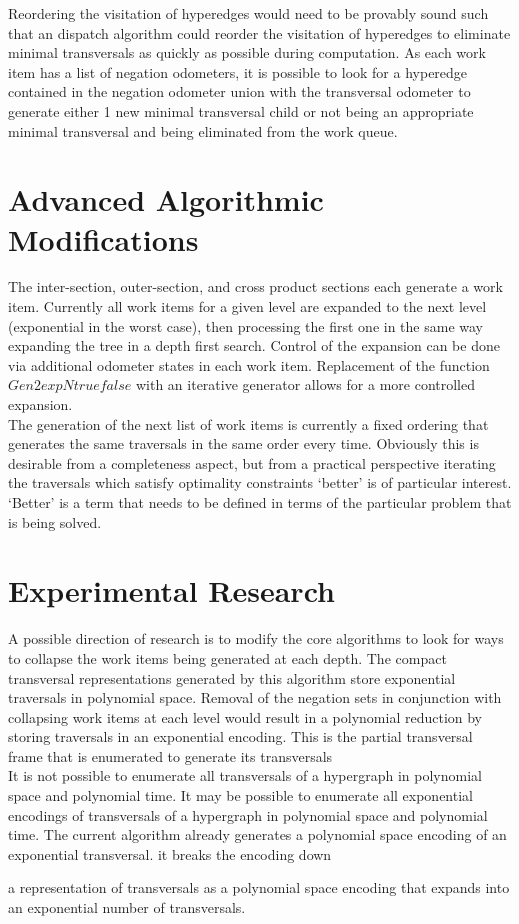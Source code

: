 Reordering the visitation of hyperedges would need to be provably sound such that an dispatch algorithm could reorder the visitation of hyperedges to eliminate minimal transversals as quickly as possible during computation. As each work item has a list of negation odometers, it is possible to look for a hyperedge contained in the negation odometer union with the transversal odometer to generate either 1 new minimal transversal child or not being an appropriate minimal transversal and being eliminated from the work queue. \\




\section{Advanced Algorithmic Modifications}
The inter-section, outer-section, and cross product sections each generate a work item. Currently all work items for a given level are expanded to the next level (exponential in the worst case), then processing the first one in the same way expanding the tree in a depth first search. Control of the expansion can be done via additional odometer states in each work item. Replacement of the function $Gen2expNtruefalse$ with an iterative generator allows for a more controlled expansion. \\

The generation of the next list of work items is currently a fixed ordering that generates the same traversals in the same order every time. Obviously this is desirable from a completeness aspect, but from a practical perspective iterating the traversals which satisfy optimality constraints `better' is of particular interest. `Better' is a term that needs to be defined in terms of the particular problem that is being solved. \cite{khachiyan2006efficient}\\




\section{Experimental Research}
A possible direction of research is to modify the core algorithms to look for ways to collapse the work items being generated at each depth. The compact transversal representations generated by this algorithm store exponential traversals in polynomial space. Removal of the negation sets in conjunction with collapsing work items at each level would result in a polynomial reduction by storing traversals in an exponential encoding. This is the partial transversal frame that is enumerated to generate its transversals \\

It is not possible to enumerate all transversals of a hypergraph in polynomial space and polynomial time. It may be possible to enumerate all exponential encodings of transversals of a hypergraph in polynomial space and polynomial time. The current algorithm already generates a polynomial space encoding of an exponential transversal. it breaks the encoding down 

a representation of transversals as a polynomial space encoding that expands into an exponential number of transversals.


